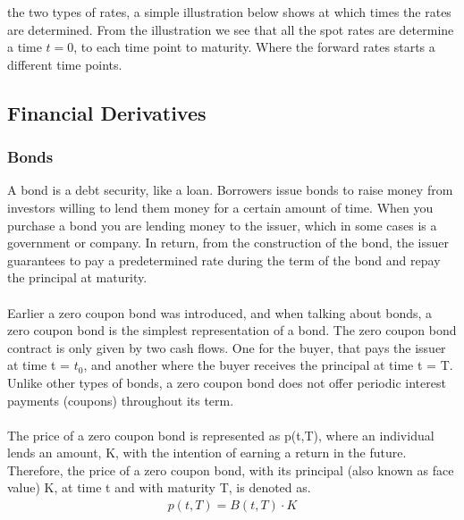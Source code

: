 the two types of rates, a simple illustration below shows at which times the rates are determined. From the illustration
we see that all the spot rates are determine a time $t=0$, to each time point to maturity. Where the forward rates starts
a different time points. 
\begin{center}
\end{center}
\subsection{Financial Derivatives}
\subsubsection{Bonds}
A bond is a debt security, like a loan. Borrowers issue bonds to raise money 
from investors willing to lend them money for a certain amount of time.
When you purchase a bond you are lending money to the issuer, which in 
some cases is a government or company. In return, from the construction of the 
bond, the issuer guarantees to pay a predetermined rate during the term of the bond
and repay the principal at maturity. 
\\\\
Earlier a zero coupon bond was introduced, and when talking about bonds, a zero coupon 
bond is the simplest representation of a bond. The zero coupon bond contract is 
only given by two cash flows. One for the buyer, that pays the issuer at time 
t = $t_0$, and another where the buyer receives the principal at time t = T.
Unlike other types of bonds, a zero coupon bond does not offer periodic 
interest payments (coupons) throughout its term. \cite{Bjork} 
\\\\
The price of a zero coupon bond is represented as 
p(t,T), where an individual lends an amount, K, with the intention of earning a
return in the future. Therefore, the price of a zero coupon bond, with 
its principal (also known as face value) K, at time t and with maturity 
T, is denoted as.
\begin{align*}
    p(t,T)= B(t,T)\cdot K
\end{align*}
